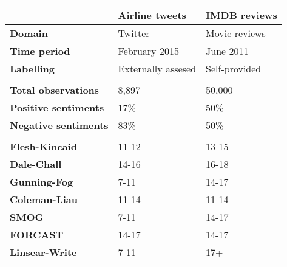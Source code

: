 \begin{tabular}{|l|l|l|} \cline{2-3}
\multicolumn{1}{c|}{} & \textbf{Airline tweets} & \textbf{IMDB reviews} \\ \hline
\textbf{Domain} & Twitter & Movie reviews \\ \hline
\textbf{Time period} & February 2015 & June 2011 \\ \hline
\textbf{Labelling} & Externally assesed & Self-provided\\ \hline
 \multicolumn{3}{c}{} \\ [-1.5ex] \hline
\textbf{Total observations} & 8,897 & 50,000 \\ \hline
\textbf{Positive sentiments} & 17\% & 50\% \\ \hline
\textbf{Negative sentiments} & 83\% & 50\%\\ \hline
 \multicolumn{3}{c}{} \\ [-1.5ex] \hline
\textbf{Flesh-Kincaid} & 11-12 & 13-15 \\ \hline
\textbf{Dale-Chall} & 14-16 & 16-18 \\ \hline
\textbf{Gunning-Fog} & 7-11 & 14-17 \\ \hline
\textbf{Coleman-Liau} & 11-14 & 11-14 \\ \hline
\textbf{SMOG} & 7-11 & 14-17 \\ \hline
\textbf{FORCAST} & 14-17 & 14-17 \\ \hline
\textbf{Linsear-Write} & 7-11 & 17+ \\ \hline
\end{tabular}